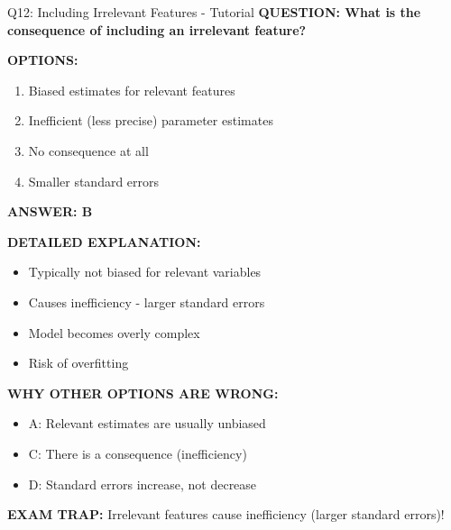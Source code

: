 \documentclass[8pt]{beamer}
\begin{document}
	\begin{frame}{Q12: Including Irrelevant Features - Tutorial}
		\fontsize{6.5}{7.5}\selectfont
		\textbf{QUESTION: What is the consequence of including an irrelevant feature?}
		
		\vspace{0.1cm}
		\textbf{OPTIONS:}
		\begin{enumerate}
			\item Biased estimates for relevant features
			\item Inefficient (less precise) parameter estimates
			\item No consequence at all
			\item Smaller standard errors
		\end{enumerate}
		
		\vspace{0.1cm}
		\textcolor{myblue}{\textbf{ANSWER: B}}
		
		\vspace{0.1cm}
		\textbf{DETAILED EXPLANATION:}
		\begin{itemize}
			\item Typically not biased for relevant variables
			\item Causes inefficiency - larger standard errors
			\item Model becomes overly complex
			\item Risk of overfitting
		\end{itemize}
		
		\vspace{0.1cm}
		\textcolor{myred}{\textbf{WHY OTHER OPTIONS ARE WRONG:}}
		\begin{itemize}
			\item \textcolor{myred}{A:} Relevant estimates are usually unbiased
			\item \textcolor{myred}{C:} There is a consequence (inefficiency)
			\item \textcolor{myred}{D:} Standard errors increase, not decrease
		\end{itemize}
		
		\textcolor{myred}{\textbf{EXAM TRAP:}} Irrelevant features cause \textcolor{myblue}{inefficiency} (larger standard errors)!
	\end{frame}
	
\end{document}
